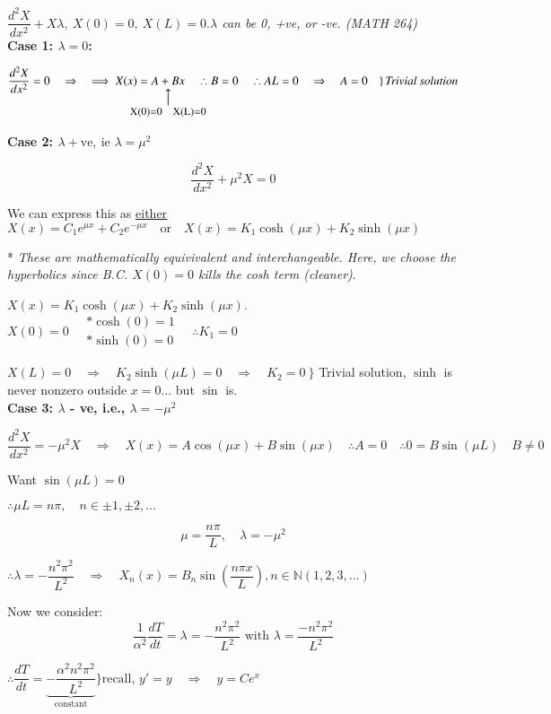 \documentclass{report}
\makeatletter
\newcommand\parrow[3][3ex]{%
 \begin{array}[t]{@{}c@{}} #2 \\
  \left\uparrow\vcenter{\hrule height #1}\right.\kern-\nulldelimiterspace\\
  \makebox[0pt]{\small#3}
  \end{array}%
}
\makeatother
\begin{document}
$\dfrac{d^2X}{dx^2} + X\lambda,\ X(0)=0,\ X(L)=0$.\quad \textit{$\lambda$ can be 0, +ve, or -ve. (MATH 264)}\\


\textbf{Case 1: $\lambda=0$:}

$$
\frac{d^2X}{dx^2} = 0\quad\Rightarrow\quad \implies X(x) = \parrow{A + Bx}{X(0)=0\quad X(L)=0}\quad\left. \therefore B=0\quad \therefore AL=0\quad\Rightarrow\quad A=0\quad\right\}\text{\textit{Trivial solution}}
$$

\textbf{Case 2: $\lambda +\text{ve},\ \text{ie } \lambda=\mu^2$}

$$
\frac{d^2X}{dx^2} + \mu^2 X = 0
$$

We can express this as \underline{either} $X(x) = C_1 e^{\mu x} + C_2 e^{-\mu x} \quad \text{or} \quad X(x) = K_1 \cosh(\mu x) + K_2 \sinh(\mu x)$

* \textit{These are mathematically equivivalent and interchangeable. Here, we choose the hyperbolics since B.C. $X(0)=0$ kills the cosh term (cleaner)}.

$X(x)=K_1\cosh(\mu x)+K_2\sinh(\mu x)$. $X(0)=0\quad \begin{array}{l}
    *\cosh(0)=1 \\
    *\sinh(0)=0 
\end{array} \quad \therefore K_1=0$

$X(L)=0\quad\Rightarrow\quad K_2\sinh(\mu L)=0\quad\Rightarrow\quad K_2=0\ \}$ Trivial solution, $\sinh$ is never nonzero outside $x=0$... but $\sin$ is.\\

\textbf{Case 3: $\lambda$ - ve, i.e., $\lambda = -\mu^2$}

$$
\frac{d^2X}{dx^2} = - \mu^2 X \quad\Rightarrow\quad X(x) = A \cos(\mu x) + B \sin(\mu x)\quad \therefore A=0\quad \therefore 0=B\sin(\mu L)\quad B\neq 0
$$

Want $\sin(\mu L)=0$

$\therefore \mu L=n\pi,\quad n\in \pm1,\pm 2,\ldots$

$$
\mu=\dfrac{n\pi}{L},\quad \lambda=-\mu^2
$$

$\therefore \lambda=-\dfrac{n^2\pi^2}{L^2}\quad\Rightarrow\quad X_n(x)=B_n\sin\left(\dfrac{n\pi x}{L}\right), n\in\mathbb{N}(1,2,3,\ldots)$

Now we consider:
$$
\frac{1}{\alpha^2} \frac{dT}{dt} = \lambda = -\frac{n^2 \pi^2}{L^2} \text{ with } \lambda=\dfrac{-n^2\pi^2}{L^2}
$$

$\therefore \dfrac{dT}{dt}=\left.\underbrace{-\dfrac{\alpha^2n^2\pi^2}{L^2}}_{\text{constant}}\right.\}\text{recall, } y'=y\quad \Rightarrow\quad y=Ce^x$
\end{document}
